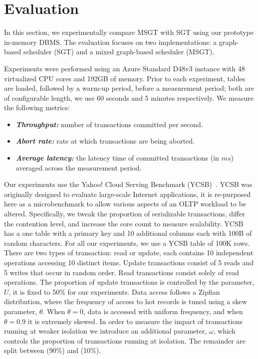 \section{Evaluation}
\label{sec:msgt-evaluation}

In this section, we experimentally compare MSGT with SGT using our prototype in-memory DBMS. The evaluation focuses on 
two implementations: a graph-based scheduler (SGT) and a mixed graph-based scheduler (MSGT).

Experiments were performed using an Azure Standard D48v3 instance with 48 virtualized CPU cores and 192GB of memory. 
Prior to each experiment, tables are loaded, followed by a warm-up period, before a measurement period; both are of 
configurable length, we use 60 seconds and 5 minutes respectively. We measure the following metrics:
\begin{itemize}
\item \textbf{\emph{Throughput:}} number of transactions committed per second.
\item \textbf{\emph{Abort rate:}} rate at which transactions are being aborted.
\item \textbf{\emph{Average latency:}} the latency time of committed transactions (in $ms$) averaged across the 
measurement period.
\end{itemize}

Our experiments use the Yahoo! Cloud Serving Benchmark (YCSB)~\cite{DBLP:conf/cloud/CooperSTRS10}. YCSB was originally
designed to evaluate large-scale Internet applications, it is re-purposed here as a microbenchmark to allow various 
aspects of an OLTP workload to be altered. Specifically, we tweak the proportion of serializable transactions, differ 
the contention level, and increase the core count to measure scalability. YCSB has a one table with a primary key and 
10 additional columns each with 100B of random characters. For all our experiments, we use a YCSB table of 100K rows. 
There are two types of transaction: read or update, each contains 10 independent operations accessing 10  distinct 
items. Update transactions consist of 5 reads and 5 writes that  occur in random order. Read transactions consist 
solely of read operations. The proportion of update transactions is controlled by the parameter, $U$, it is fixed to 
50\% for our experiments. Data access follows a Zipfian distribution, where the frequency of access to hot records is 
tuned using a skew parameter, $\theta$. When $\theta = 0$, data is accessed with uniform frequency, and when 
$\theta = 0.9$ it is extremely skewed. In order to measure the impact of transactions running at weaker isolation we 
introduce an additional parameter, $\omega$, which controls the proportion of transactions running at 
 isolation. The remainder are split between  (90\%) and 
 (10\%).

